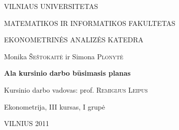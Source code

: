 \documentclass[a4paper]{article}
\begin{document}
\begin{titlepage}
\centerline{ \large VILNIAUS UNIVERSITETAS}
\bigskip
\centerline{\large MATEMATIKOS IR INFORMATIKOS FAKULTETAS}
\smallskip

\centerline{\large  EKONOMETRINĖS ANALIZĖS KATEDRA}
\vskip 200pt
\centerline{ \large Monika \textsc{Šeštokaitė} ir \large Simona \textsc{Plonytė}}
\vskip 50pt
\centerline{\bf \Large Ala kursinio darbo būsimasis planas}
\vskip 25pt

\centerline{Kursinio darbo vadovas: prof. \textsc{Remigijus Leipus}}
\vskip 50pt
\hfill Ekonometrija, III kursas, I grupė
\vskip 100pt
\centerline{\large VILNIUS 2011}

\end{titlepage}
\end{document}
